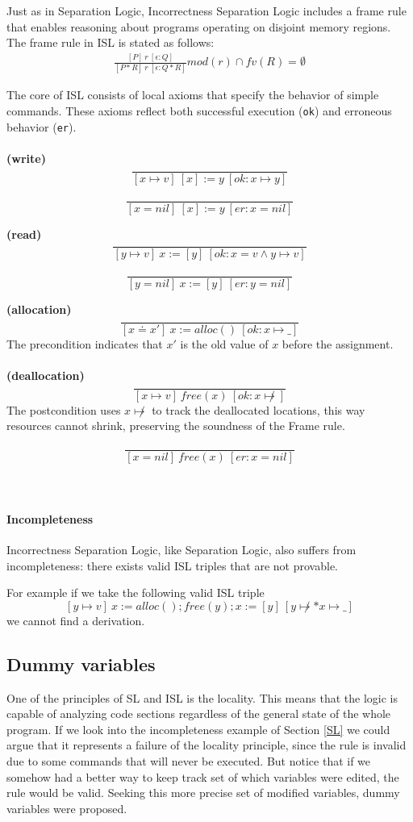 \documentclass[parskip=half]{scrartcl}
\begin{document}
Just as in Separation Logic, Incorrectness Separation Logic includes a frame rule that enables reasoning about programs operating on disjoint memory regions. The frame rule in ISL is stated as follows:
\begin{align*}
    \frac{[P]\ r\ [\epsilon: Q]}{[P\ast R]\ r\ [\epsilon: Q\ast R]}mod(r)\cap fv(R)=\emptyset
\end{align*}

The core of ISL consists of local axioms that specify the behavior of simple commands. These axioms reflect both successful execution (\texttt{ok}) and erroneous behavior (\texttt{er}).
\\\\
\textbf{(write)} 
\[
\frac{}{[x\mapsto v]\ [x]:=y\ [ok:x\mapsto y]}
\]

\[
\frac{}{[x=nil]\ [x]:=y\ [er:x=nil]}
\]

\textbf{(read)} 
\[
\frac{}{[y\mapsto v]\ x:=[y]\ [ok:x=v\wedge y\mapsto v]}
\]

\[
\frac{}{[y=nil]\ x:=[y]\ [er:y=nil]}
\]

\textbf{(allocation)} 
\[
\frac{}{[x\doteq x']\ x:=alloc()\ [ok:x\mapsto \_]}
\]
The precondition indicates that $x'$ is the old value of $x$ before the assignment.
\\\\
\textbf{(deallocation)} 
\[
\frac{}{[x\mapsto v]\ free(x)\ [ok:x\not\mapsto]}
\]
The postcondition uses $x\not\mapsto$ to track the deallocated locations, this way resources cannot shrink, preserving the soundness of the Frame rule.

\[
\frac{}{[x=nil]\ free(x)\ [er:x=nil]}
\]
\\\\
\paragraph{Incompleteness}
Incorrectness Separation Logic, like Separation Logic, also suffers from incompleteness: there exists valid ISL triples that are not provable.

For example if we take the following valid ISL triple
\[
[y\mapsto v]\ x:=alloc();free(y);x:=[y]\ [y\not\mapsto\ast x\mapsto\_]
\]
we cannot find a derivation.

\subsection{Dummy variables}
One of the principles of SL and ISL is the locality. This means that the logic is capable of analyzing code sections regardless of the general state of the whole program. If we look into the incompleteness example of Section \ref{SL} we could argue that it represents a failure of the locality principle, since the rule is invalid due to some commands that will never be executed. But notice that if we somehow had a better way to keep track set of which variables were edited, the rule would be valid. Seeking this more precise set of modified variables, dummy variables were proposed.
\end{document}
